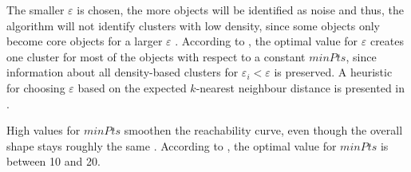 The smaller $\varepsilon$ is chosen, the more objects will be identified as noise and thus, the algorithm will not identify clusters with low density, 
since some objects only become core objects for a larger $\varepsilon$ \cite{OPTICS1999}.
According to \citeauthor{OPTICS1999}, the optimal value for $\varepsilon$ creates one cluster for most of the objects with respect to a constant $minPts$,
since information about all density-based clusters for $\varepsilon_i < \varepsilon$ is preserved.
A heuristic for choosing $\varepsilon$ based on the expected $k$-nearest neighbour distance is presented in \cite{OPTICS1999}.

High values for $minPts$ smoothen the reachability curve, even though the overall shape stays roughly the same \cite{OPTICS1999}.
According to \citeauthor{OPTICS1999}, the optimal value for $minPts$ is between 10 and 20.